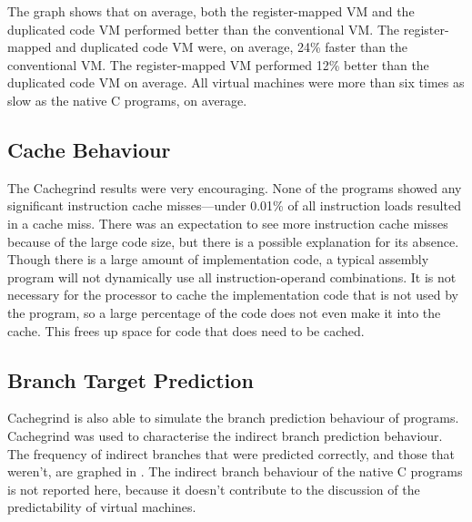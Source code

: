 		The graph shows that on average, both the register-mapped VM and the duplicated code VM performed better than the conventional VM. The register-mapped and duplicated code VM were, on average, 24\% faster than the conventional VM. The register-mapped VM performed 12\% better than the duplicated code VM on average. All virtual machines were more than six times as slow as the native C programs, on average.
	
		\subsection{Cache Behaviour}
		The Cachegrind results were very encouraging. None of the programs showed any significant instruction cache misses---under 0.01\% of all instruction loads resulted in a cache miss. There was an expectation to see more instruction cache misses because of the large code size, but there is a possible explanation for its absence. Though there is a large amount of implementation code, a typical assembly program will not dynamically use all instruction-operand combinations. It is not necessary for the processor to cache the implementation code that is not used by the program, so a large percentage of the code does not even make it into the cache. This frees up space for code that does need to be cached.
		
		\subsection{Branch Target Prediction}
		Cachegrind is also able to simulate the branch prediction behaviour of programs. Cachegrind was used to characterise the indirect branch prediction behaviour. The frequency of indirect branches that were predicted correctly, and those that weren't, are graphed in . The indirect branch behaviour of the native C programs is not reported here, because it doesn't contribute to the discussion of the predictability of virtual machines.
		
